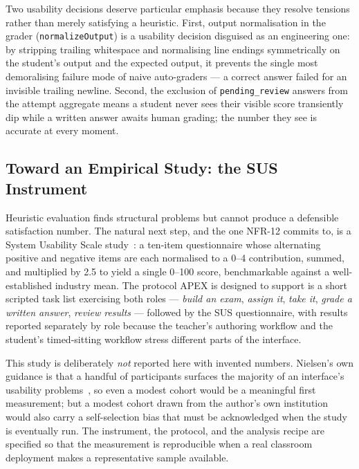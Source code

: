 Two usability decisions deserve particular emphasis because they resolve tensions
rather than merely satisfying a heuristic. First, output normalisation in the grader
(\texttt{normalizeOutput}) is a usability decision disguised as an engineering one: by
stripping trailing whitespace and normalising line endings symmetrically on the
student's output and the expected output, it prevents the single most demoralising
failure mode of naive auto-graders --- a correct answer failed for an invisible
trailing newline. Second, the exclusion of \texttt{pending\_review} answers from the
attempt aggregate means a student never sees their visible score transiently dip while
a written answer awaits human grading; the number they see is accurate at every moment.

\subsection{Toward an Empirical Study: the SUS Instrument}
\label{sec:res-sus}

Heuristic evaluation finds structural problems but cannot produce a defensible
satisfaction number. The natural next step, and the one NFR-12 commits to, is a
System Usability Scale study~\cite{brooke1996sus}: a ten-item questionnaire whose
alternating positive and negative items are each normalised to a 0--4 contribution,
summed, and multiplied by 2.5 to yield a single 0--100 score, benchmarkable against a
well-established industry mean. The protocol APEX is designed to support is a short
scripted task list exercising both roles --- \emph{build an exam}, \emph{assign it},
\emph{take it}, \emph{grade a written answer}, \emph{review results} --- followed by
the SUS questionnaire, with results reported separately by role because the teacher's
authoring workflow and the student's timed-sitting workflow stress different parts of
the interface.

This study is deliberately \emph{not} reported here with invented numbers. Nielsen's
own guidance is that a handful of participants surfaces the majority of an interface's
usability problems~\cite{nielsen-heuristics}, so even a modest cohort would be a
meaningful first measurement; but a modest cohort drawn from the author's own
institution would also carry a self-selection bias that must be acknowledged when the
study is eventually run. The instrument, the protocol, and the analysis recipe are
specified so that the measurement is reproducible when a real classroom deployment
makes a representative sample available.

